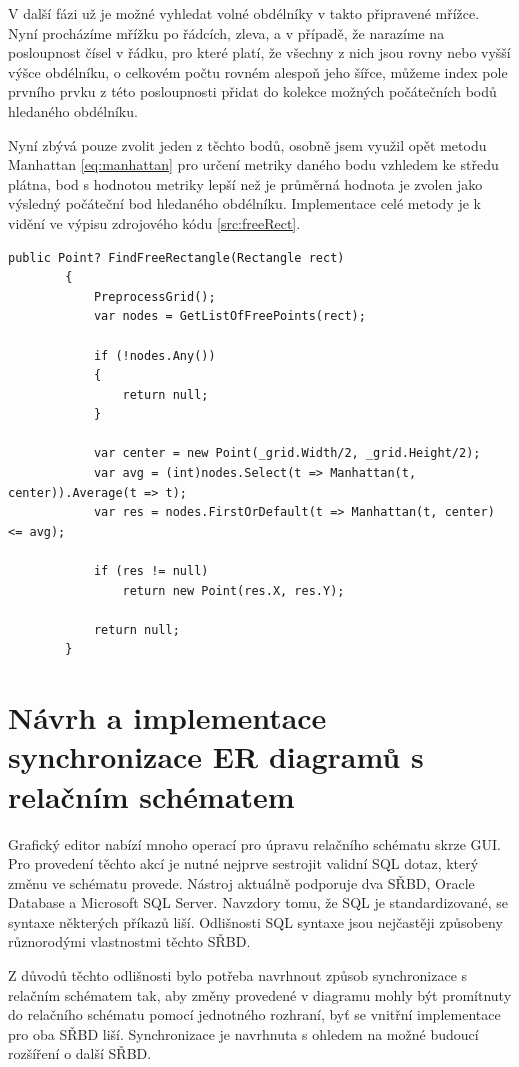 \documentclass[czech,bachelor,public,dept460,male,oneside]{diploma}
\begin{document}
		V další fázi už je možné vyhledat volné obdélníky v takto připravené mřížce. Nyní procházíme mřížku po řádcích, zleva, a v případě, že narazíme na posloupnost čísel v řádku, pro které platí, že všechny z nich jsou rovny nebo vyšší výšce obdélníku, o celkovém počtu rovném alespoň jeho šířce, můžeme index pole prvního prvku z této posloupnosti přidat do kolekce možných počátečních bodů hledaného obdélníku.
		
		Nyní zbývá pouze zvolit jeden z těchto bodů, osobně jsem využil opět metodu Manhattan \ref{eq:manhattan} pro určení metriky daného bodu vzhledem ke středu plátna, bod s hodnotou metriky lepší než je průměrná hodnota je zvolen jako výsledný počáteční bod hledaného obdélníku. Implementace celé metody je k vidění ve výpisu zdrojového kódu \ref{src:freeRect}.
		
		\newpage
		\begin{lstlisting}[label=src:freeRect,caption=Nalezení volného obdélníku v mřížce]
		public Point? FindFreeRectangle(Rectangle rect)
		{
			PreprocessGrid();
			var nodes = GetListOfFreePoints(rect);
			
			if (!nodes.Any())
			{
				return null;
			}
			
			var center = new Point(_grid.Width/2, _grid.Height/2);
			var avg = (int)nodes.Select(t => Manhattan(t, center)).Average(t => t);
			var res = nodes.FirstOrDefault(t => Manhattan(t, center) <= avg);
			
			if (res != null) 
				return new Point(res.X, res.Y);
			
			return null;
		}
		\end{lstlisting}
		
\newpage
\section{Návrh a implementace synchronizace ER diagramů s relačním schématem}
Grafický editor nabízí mnoho operací pro úpravu relačního schématu skrze GUI. Pro provedení těchto akcí je nutné nejprve sestrojit validní SQL dotaz, který změnu ve schématu provede. Nástroj aktuálně podporuje dva SŘBD, Oracle Database a Microsoft SQL Server. Navzdory tomu, že SQL je standardizované, se syntaxe některých příkazů liší. Odlišnosti SQL syntaxe jsou nejčastěji způsobeny různorodými vlastnostmi těchto SŘBD. 

Z důvodů těchto odlišnosti bylo potřeba navrhnout způsob synchronizace s relačním schématem tak, aby změny provedené v diagramu mohly být promítnuty do relačního schématu pomocí jednotného rozhraní, byť se vnitřní implementace pro oba SŘBD liší. Synchronizace je navrhnuta s ohledem na možné budoucí rozšíření o další SŘBD.
	
\end{document}
